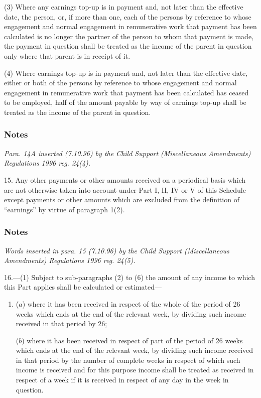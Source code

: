 \documentclass[a4paper]{article}
\newcommand\amendment[1]{\subsubsection*{Notes}{\itshape\frenchspacing\footnotesize #1 \par\goodbreak}}
\begin{document}
(3) Where any earnings top-up is in payment and, not later than the effective date, the person, or, if more than one, each of the persons by reference to whose engagement and normal engagement in remunerative work that payment has been calculated is no longer the partner of the person to whom that payment is made, the payment in question shall be treated as the income of the parent in question only where that parent is in receipt of it.

(4) Where earnings top-up is in payment and, not later than the effective date, either or both of the persons by reference to whose engagement and normal engagement in remunerative work that payment has been calculated has ceased to be employed, half of the amount payable by way of earnings top-up shall be treated as the income of the parent in question.

\amendment{
Para. 14A inserted (7.10.96) by the Child Support (Miscellaneous Amendments) Regulations 1996 reg. 24(4).
}


\medskip

15.  Any other payments or other amounts received on a periodical basis which are not otherwise taken into account under Part I, II, IV or V of this Schedule
except payments or other amounts which are excluded from the definition of “earnings” by virtue of paragraph 1(2).  %

\amendment{
Words inserted in para. 15 (7.10.96) by the Child Support (Miscellaneous Amendments) Regulations 1996 reg. 24(5).
}

\medskip

16.—(1) Subject to sub-paragraphs (2) to (6) the amount of any income to which this Part applies shall be calculated or estimated—
\begin{enumerate}\item[]
($a$) where it has been received in respect of the whole of the period of 26 weeks which ends at the end of the relevant week, by dividing such income received in that period by 26;

($b$) where it has been received in respect of part of the period of 26 weeks which ends at the end of the relevant week, by dividing such income received in that period by the number of complete weeks in respect of which such income is received and for this purpose income shall be treated as received in respect of a week if it is received in respect of any day in the week in question.
\end{enumerate}
\end{document}
